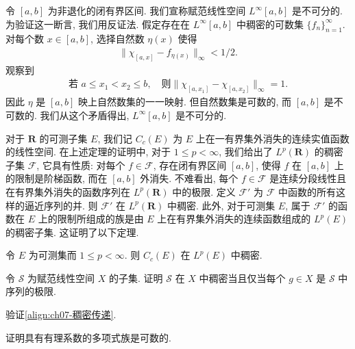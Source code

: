 \documentclass[../../main.tex]{subfiles}
\begin{document}
\begin{example}\label{example:ch07-Linfty不可分}
令 $[a,b]$ 为非退化的闭有界区间. 我们宣称赋范线性空间 $L^{\infty}[a,b]$ 是不可分的. 为验证这一断言, 我们用反证法. 假定存在在 $L^{\infty}[a,b]$ 中稠密的可数集 $\{f_{n}\}_{n=1}^{\infty}$. 对每个数 $x\in[a,b]$, 选择自然数 $\eta(x)$ 使得
\begin{align*}
\|\chi_{[a,x]}-f_{\eta(x)}\|_{\infty}<1/2.
\end{align*}
观察到
\begin{align*}
\text{若 }a\leqslant x_{1}<x_{2}\leqslant b,\quad\text{则}\|\chi_{[a,x_{1}]}-\chi_{[a,x_{2}]}\|_{\infty}=1.
\end{align*}
因此 $\eta$ 是 $[a,b]$ 映上自然数集的一一映射. 但自然数集是可数的, 而 $[a,b]$ 是不可数的. 我们从这个矛盾得出, $L^{\infty}[a,b]$ 是不可分的.
\end{example}

对于 $\mathbf{R}$ 的可测子集 $E$, 我们记 $C_{c}(E)$ 为 $E$ 上在一有界集外消失的连续实值函数的线性空间. 在上述定理的证明中, 对于 $1\leqslant p<\infty$, 我们给出了 $L^{p}(\mathbf{R})$ 的稠密子集 $\mathcal{F}$, 它具有性质: 对每个 $f\in\mathcal{F}$, 存在闭有界区间 $[a,b]$, 使得 $f$ 在 $[a,b]$ 上的限制是阶梯函数, 而在 $[a,b]$ 外消失. 不难看出, 每个 $f\in\mathcal{F}$ 是连续分段线性且在有界集外消失的函数序列在 $L^{p}(\mathbf{R})$ 中的极限. 定义 $\mathcal{F}'$ 为 $\mathcal{F}$ 中函数的所有这样的逼近序列的并. 则 $\mathcal{F}'$ 在 $L^{p}(\mathbf{R})$ 中稠密. 此外, 对于可测集 $E$, 属于 $\mathcal{F}'$ 的函数在 $E$ 上的限制所组成的族是由 $E$ 上在有界集外消失的连续函数组成的 $L^{p}(E)$ 的稠密子集. 这证明了以下定理.

\begin{theorem}\label{theorem:ch07-Cc稠密}
令 $E$ 为可测集而 $1\leqslant p<\infty$. 则 $C_{c}(E)$ 在 $L^{p}(E)$ 中稠密.
\end{theorem}

\begin{exercise}\label{exercise:ch07-36}
令 $\mathcal{S}$ 为赋范线性空间 $X$ 的子集. 证明 $\mathcal{S}$ 在 $X$ 中稠密当且仅当每个 $g\in X$ 是 $\mathcal{S}$ 中序列的极限.
\end{exercise}

\begin{exercise}\label{exercise:ch07-37}
验证\eqref{align:ch07-稠密传递}.
\end{exercise}

\begin{exercise}\label{exercise:ch07-38}
证明具有有理系数的多项式族是可数的.
\end{exercise}
\end{document}
